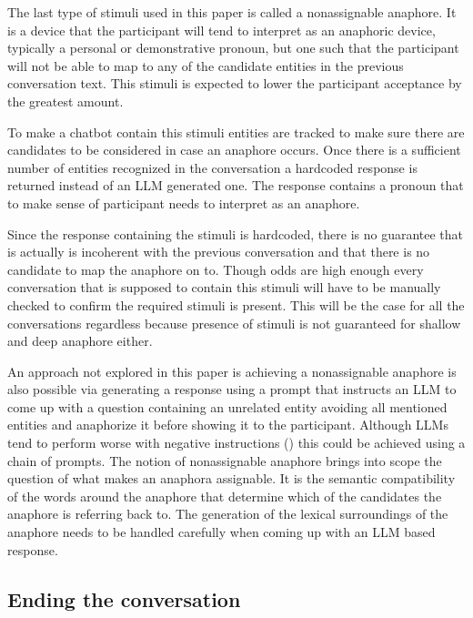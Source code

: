 \documentclass[12pt]{report}
\begin{document}
{The last type of stimuli used in this paper
is called a nonassignable anaphore.
It is a device that the participant will tend to
interpret as an anaphoric device,
typically a personal or demonstrative pronoun,
but one such that the participant will not be able
to map to any of the candidate entities
in the previous conversation text.
This stimuli is expected to lower the participant acceptance
by the greatest amount.

To make a chatbot contain this stimuli
entities are tracked to make sure
there are candidates to be considered
in case an anaphore occurs.
Once there is a sufficient number of
entities recognized in the conversation
a hardcoded response is returned instead of an LLM generated one.
The response contains a pronoun that to make sense of
participant needs to interpret as an anaphore.

Since the response containing the stimuli is hardcoded,
there is no guarantee
that is actually is incoherent with the previous conversation
and that there is no candidate to map the anaphore on to.
Though odds are high enough
every conversation that is supposed to contain this stimuli
will have to be manually checked
to confirm the required stimuli is present.
This will be the case for all the conversations regardless
because presence of stimuli is not guaranteed
for shallow and deep anaphore either.

An approach not explored in this paper is
achieving a nonassignable anaphore is also possible
via generating a response
using a prompt that instructs an LLM
to come up with a question containing an unrelated entity
avoiding all mentioned entities
and anaphorize it before showing it to the participant.
Although LLMs tend to perform worse with negative instructions ()
this could be achieved using a chain of prompts.
The notion of nonassignable anaphore
brings into scope the question of
what makes an anaphora assignable.
It is the semantic compatibility of the words around the anaphore
that determine which of the candidates the anaphore is referring back to.
The generation of the lexical surroundings of the anaphore
needs to be handled carefully
when coming up with an LLM based response.

\subsection{Ending the conversation}

}
\end{document}
